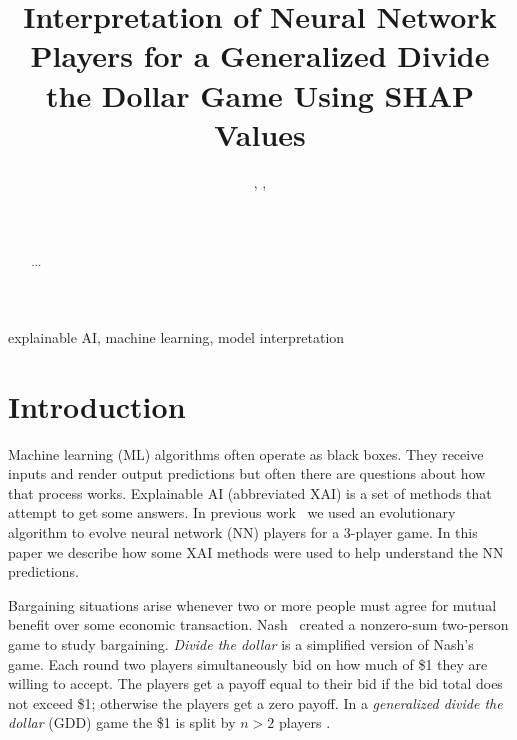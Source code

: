 \documentclass[journal]{IEEEtran} %
\begin{document}
\title{Interpretation of Neural Network Players for a Generalized Divide the Dollar Game Using SHAP Values\\

}

\author{%
    , %
    , %
    \\%
    \\%
    \\%
}

\maketitle

\begin{abstract}
    $\cdots$
\end{abstract}

\begin{IEEEkeywords}
    explainable AI, machine learning, model interpretation
\end{IEEEkeywords}

\section{Introduction}

Machine learning (ML) algorithms often operate as black boxes. They receive inputs and render output predictions but often there are questions about how that process works. Explainable AI (abbreviated XAI) is a set of methods that attempt to get some answers.
In previous work~\cite{gree1} we used an evolutionary algorithm to evolve neural network (NN) players for a 3-player game. In this paper we describe how some XAI methods were used to help understand the NN predictions.


Bargaining situations arise whenever two or more people must agree for mutual benefit over some economic transaction. Nash~\cite{nash} created a nonzero-sum two-person game to study bargaining. \textit{Divide the dollar} is a simplified version of Nash's game. Each round two players simultaneously bid on how much of \$1 they are willing to accept. The players get a payoff equal to their bid if the bid total does not exceed \$1; otherwise the players get a zero payoff. In a \emph{generalized divide the dollar} (GDD) game the \$1 is split by $n>2$ players \cite{dan1}. 
\end{document}
